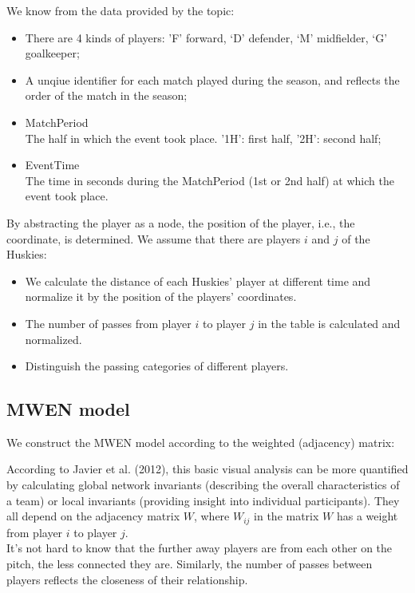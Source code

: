 \documentclass{mcmthesis}
\begin{document}
We know from the data provided by the topic:
\begin{itemize}
\item There are 4 kinds of players: ’F’ forward, ‘D’ defender, ‘M’ midfielder, ‘G’ goalkeeper;  
\item A unqiue identifier for each match played during the season, and reflects the order of the match in the season;
\item MatchPeriod\\
The half in which the event took place. '1H': first half, '2H': second half;
\item EventTime\\
The time in seconds during the MatchPeriod (1st or 2nd half) at which the event took place.
\end{itemize}


By abstracting the player as a node, the position of the player, i.e., the coordinate, is determined. We assume that there are players $i$ and $j$ of the Huskies:
\begin{itemize}
\item We calculate the distance of each Huskies’ player at different time and normalize it by the position of the players' coordinates.
\item The number of passes from player $i$ to player $j$ in the table is calculated and normalized.
\item Distinguish the passing categories of different players.
\end{itemize}


\subsection{MWEN model}  %

We construct the MWEN model according to the weighted (adjacency) matrix:

According to Javier et al. (2012), this basic visual analysis can be more quantified by calculating global network invariants (describing the overall characteristics of a team) or local invariants (providing insight into individual participants). They all depend on the adjacency matrix $W$, where $W_{ij}$ in the matrix $W$ has a weight from player $i$ to player $j$.\\
It's not hard to know that the further away players are from each other on the pitch, the less connected they are. Similarly, the number of passes between players reflects the closeness of their relationship.
\end{document}
